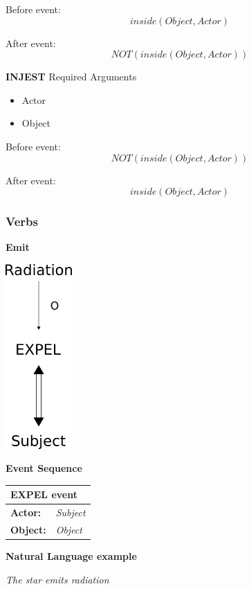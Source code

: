 \documentclass[../dissertation]{subfiles}
\begin{document}
Before event:
\[inside(Object, Actor)\]

After event:
\[NOT(inside(Object, Actor))\]

\textbf{INJEST}
Required Arguments
\begin{itemize}
	\item Actor
    \item Object
\end{itemize}


Before event:
\[NOT(inside(Object, Actor))\]

After event:
\[inside(Object, Actor)\]


\subsubsection{Verbs}
\textbf{Emit}
\begin{center}
	\includegraphics[height=200pt]{emit-cd.png}
    
	\bigskip

\end{center}

\textbf{Event Sequence}
\begin{center}

    \begin{tabular}{l l}
      \toprule
      \multicolumn{2}{l}{\textbf{EXPEL event}}\\
      \hline
      \textbf{Actor:} & \textit{Subject}\\
      \textbf{Object:} & \textit{Object}\\
      \bottomrule
    \end{tabular}
\end{center}

\textbf{Natural Language example}

\textit{The star emits radiation}
\end{document}
